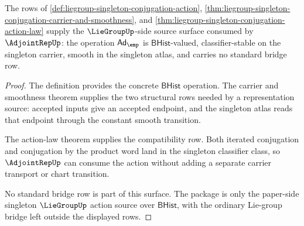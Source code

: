 \begin{theorem}
\label{thm:liegroup-singleton-adjointrep-source-surface}
The rows of
\autoref{def:liegroup-singleton-conjugation-action},
\autoref{thm:liegroup-singleton-conjugation-carrier-and-smoothness}, and
\autoref{thm:liegroup-singleton-conjugation-action-law} supply the
$\LieGroupUp$-side source surface consumed by $\AdjointRepUp$: the operation
$\mathsf{Ad}_{\emp}$ is $\mathsf{BHist}$-valued, classifier-stable on the
singleton carrier, smooth in the singleton atlas, and carries no standard bridge
row.
\end{theorem}
\begin{proof}
The definition provides the concrete $\mathsf{BHist}$ operation. The carrier and
smoothness theorem supplies the two structural rows needed by a representation
source: accepted inputs give an accepted endpoint, and the singleton atlas reads
that endpoint through the constant smooth transition.

The action-law theorem supplies the compatibility row. Both iterated
conjugation and conjugation by the product word land in the singleton classifier
class, so $\AdjointRepUp$ can consume the action without adding a separate
carrier transport or chart transition.

No standard bridge row is part of this surface. The package is only the
paper-side singleton $\LieGroupUp$ action source over $\mathsf{BHist}$, with the
ordinary Lie-group bridge left outside the displayed rows.
\end{proof}

